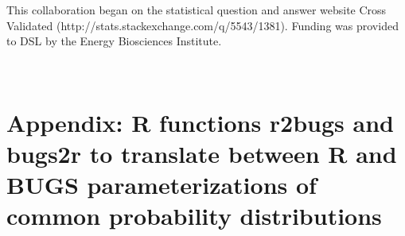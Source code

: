 This collaboration began on the statistical question and answer website Cross Validated (http://stats.stackexchange.com/q/5543/1381). Funding was provided to DSL by the Energy Biosciences Institute.



\newpage
\address{David S. LeBauer\\
Department of Plant Biology\\
Energy Biosciences Institute\\
University of Illinois, USA}\\

\address{Michael C. Dietze\\
Department of Earth And Environment\\
Boston University, USA}

\address{Ben M. Bolker\\
Department of Mathematics and Statistics\\
McMaster University, Canada}


\section{Appendix: R functions r2bugs and bugs2r to translate between R and BUGS parameterizations of common probability distributions}


